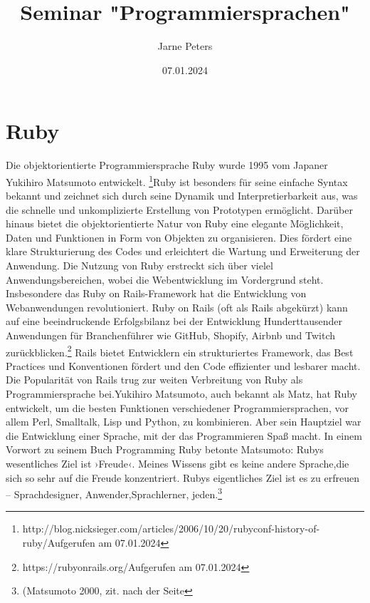 \documentclass{article}
\title{Seminar "Programmiersprachen" }
\author{Jarne Peters}
\date{07.01.2024}
\begin{document}
\maketitle


\section*{Ruby}

Die objektorientierte Programmiersprache Ruby wurde 1995 vom Japaner Yukihiro Matsumoto entwickelt. \footnote{http://blog.nicksieger.com/articles/2006/10/20/rubyconf-history-of-ruby/Aufgerufen am 07.01.2024}Ruby ist besonders für seine einfache Syntax bekannt und zeichnet sich durch seine Dynamik und Interpretierbarkeit aus, was die schnelle und unkomplizierte Erstellung von Prototypen ermöglicht. Darüber hinaus bietet die objektorientierte Natur von Ruby eine elegante Möglichkeit, Daten und Funktionen in Form von Objekten zu organisieren. Dies fördert eine klare Strukturierung des Codes und erleichtert die Wartung und Erweiterung der Anwendung. Die Nutzung von Ruby erstreckt sich über vielel Anwendungsbereichen, wobei die Webentwicklung im Vordergrund steht. Insbesondere das Ruby on Rails-Framework hat die Entwicklung von Webanwendungen revolutioniert. Ruby on Rails (oft als Rails abgekürzt) kann auf eine beeindruckende Erfolgsbilanz bei der Entwicklung Hunderttausender Anwendungen für Branchenführer wie GitHub, Shopify, Airbnb und Twitch zurückblicken.\footnote{https://rubyonrails.org/Aufgerufen am 07.01.2024} Rails bietet Entwicklern ein strukturiertes Framework, das Best Practices und Konventionen fördert und den Code effizienter und lesbarer macht. Die Popularität von Rails trug zur weiten Verbreitung von Ruby als Programmiersprache bei.Yukihiro Matsumoto, auch bekannt als Matz, hat Ruby entwickelt, um die besten Funktionen verschiedener Programmiersprachen, vor allem Perl, Smalltalk, Lisp und Python, zu kombinieren. Aber sein Hauptziel war die Entwicklung einer Sprache, mit der das Programmieren Spaß macht. In einem Vorwort zu seinem Buch 	\glqq Programming Ruby \grqq{} betonte Matsumoto: \glqq Rubys wesentliches Ziel ist ›Freude‹. Meines Wissens gibt es keine andere Sprache,die sich so sehr auf die Freude konzentriert. Rubys eigentliches Ziel ist es zu erfreuen – Sprachdesigner, Anwender,Sprachlerner, jeden.\grqq{}\footnote{(Matsumoto 2000, zit. nach der Seite
}
\end{document}
